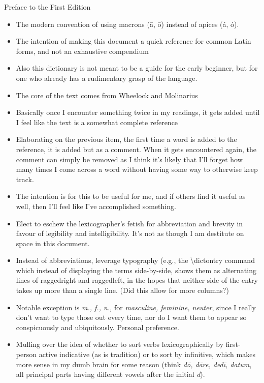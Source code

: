 Preface to the First Edition

\begin{itemize}
  \item The modern convention of using macrons (\=a, \=o)
    instead of apices (\'a, \'o).
  \item The intention of making this document a quick reference
    for common Latin forms, and not an exhaustive compendium
  \item Also this dictionary is not meant to be a guide for the
    early beginner, but for one who already has a rudimentary
    grasp of the language.
  \item The core of the text comes from Wheelock and Molinarius
  \item Basically once I encounter something twice in my readings,
    it gets added until I feel like the text is a somewhat
    complete reference
  \item Elaborating on the previous item, the first time a word
    is added to the reference, it is added but as a comment.  When
    it gets encountered again, the comment can simply be removed
    as I think it's likely that I'll forget how many times I come
    across a word without having some way to otherwise keep track.
  \item The intention is for this to be useful for me, and if others
    find it useful as well, then I'll feel like I've accomplished
    something.
  \item Elect to eschew the lexicographer's fetish for abbreviation
    and brevity in favour of legibility and intelligibility.  It's
    not as though I am destitute on space in this document.
  \item Instead of abbreviations, leverage typography (e.g., the
    \textbackslash dictontry command which instead of displaying the terms
    side-by-side, shows them as alternating lines of raggedright
    and raggedleft, in the hopes that neither side of the entry
    takes up more than a single line.  (Did this allow for more
    columns?)
  \item Notable exception is \textit{m., f., n.,} for \textit{%
    masculine, feminine, neuter}, since I really don't want to
    type those out every time, nor do I want them to appear so
    conspicuously and ubiquitously.  Personal preference.
  \item Mulling over the idea of whether to sort verbs
    lexicographically by first-person active indicative (as
    is tradition) or to sort by infinitive, which makes
    more sense in my dumb brain for some reason (think
    \textit{d\=o, d\=are, ded\=i, datum}, all principal parts
    having different vowels after the initial \textit{d}).
\end{itemize}
